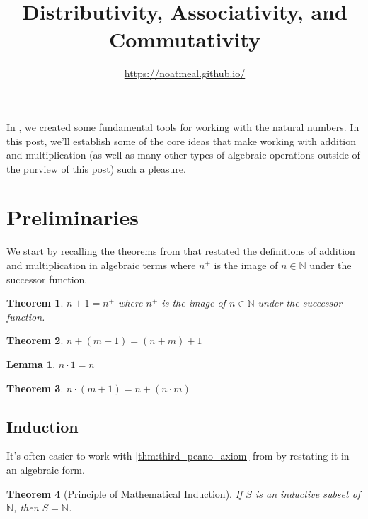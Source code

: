 \documentclass{article}
\title{Distributivity, Associativity, and Commutativity}
\author{\url{https://noatmeal.github.io/}}
\date{}
\theoremstyle{definition}
\theoremstyle{definition}
\theoremstyle{plain}
\theoremstyle{remark}
\theoremstyle{plain}
\newtheorem{theorem}{Theorem}[section]
\theoremstyle{remark}
\theoremstyle{plain}
\newtheorem{lemma}{Lemma}[section]
\theoremstyle{plain}
\theoremstyle{plain}
\theoremstyle{plain}
\begin{document}
\maketitle

In \cite{recursion_theorem}, we created some fundamental tools for working with 
the natural numbers. In this post, we'll establish some of the core ideas that 
make working with addition and multiplication (as well as many other types of 
algebraic operations outside of the purview of this post) such a pleasure.

\section{Preliminaries}

We start by recalling the theorems from \cite{recursion_theorem} that restated 
the definitions of addition and multiplication in algebraic terms where 
\( n^{+} \) is the image of \( n \in \mathbb{N} \) under the successor function.   

\begin{theorem}
  \( n + 1 = n^{+} \) where \( n^{+} \) is the image of \( n \in \mathbb{N} \)
  under the successor function.
  \label{thm:n_plus_one}
\end{theorem}

\begin{theorem}
  \( n + (m + 1) = (n + m) + 1 \)
  \label{thm:associativity_base_case}
\end{theorem}

\begin{lemma}
  \( n \cdot 1 = n \)
  \label{lemma:n_times_one}
\end{lemma}

\begin{theorem}
  \( n \cdot (m + 1) = n + (n \cdot m) \)
  \label{thm:distributivity_base_case}
\end{theorem}


\subsection{Induction}

It's often easier to work with \autoref{thm:third_peano_axiom} from 
\cite{recursion_theorem} by restating it in an algebraic form. 

\begin{theorem}[Principle of Mathematical Induction]
  If \( S \) is an inductive subset of \( \mathbb{N} \), then 
  \( S = \mathbb{N} \).
  \label{thm:third_peano_axiom}
\end{theorem}
\end{document}
